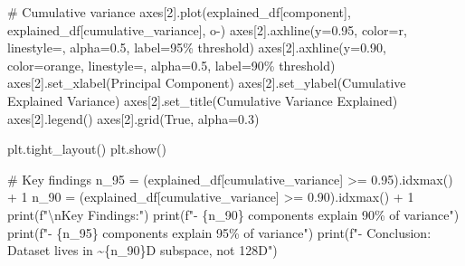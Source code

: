 \documentclass[
  letterpaper,
  DIV=11,
  numbers=noendperiod]{scrartcl}
\newenvironment{Shaded}{\begin{snugshade}}{\end{snugshade}}
\newcommand{\BuiltInTok}[1]{\textcolor[rgb]{0.00,0.23,0.31}{#1}}
\newcommand{\CharTok}[1]{\textcolor[rgb]{0.13,0.47,0.30}{#1}}
\newcommand{\CommentTok}[1]{\textcolor[rgb]{0.37,0.37,0.37}{#1}}
\newcommand{\DecValTok}[1]{\textcolor[rgb]{0.68,0.00,0.00}{#1}}
\newcommand{\FloatTok}[1]{\textcolor[rgb]{0.68,0.00,0.00}{#1}}
\newcommand{\NormalTok}[1]{\textcolor[rgb]{0.00,0.23,0.31}{#1}}
\newcommand{\OperatorTok}[1]{\textcolor[rgb]{0.37,0.37,0.37}{#1}}
\newcommand{\SpecialCharTok}[1]{\textcolor[rgb]{0.37,0.37,0.37}{#1}}
\newcommand{\SpecialStringTok}[1]{\textcolor[rgb]{0.13,0.47,0.30}{#1}}
\newcommand{\StringTok}[1]{\textcolor[rgb]{0.13,0.47,0.30}{#1}}
\newcommand{\VariableTok}[1]{\textcolor[rgb]{0.07,0.07,0.07}{#1}}
\renewenvironment{Shaded}{%
  \begin{tcolorbox}[%
    enhanced,%
    colback=codebg,%
    colframe=codebg,%
    borderline west={3pt}{0pt}{sectionblue},%
    fontupper=\small\ttfamily,%
    boxrule=0pt,%
    arc=0pt,%
    boxsep=5pt,%
    left=2mm,%
    right=2mm,%
    top=2mm,%
    bottom=2mm%
  ]%
}{%
  \end{tcolorbox}%
}
\begin{document}
\begin{Shaded}
\begin{Highlighting}[]
\CommentTok{\# Cumulative variance}
\NormalTok{axes[}\DecValTok{2}\NormalTok{].plot(explained\_df[}\StringTok{\textquotesingle{}component\textquotesingle{}}\NormalTok{], explained\_df[}\StringTok{\textquotesingle{}cumulative\_variance\textquotesingle{}}\NormalTok{], }\StringTok{\textquotesingle{}o{-}\textquotesingle{}}\NormalTok{)}
\NormalTok{axes[}\DecValTok{2}\NormalTok{].axhline(y}\OperatorTok{=}\FloatTok{0.95}\NormalTok{, color}\OperatorTok{=}\StringTok{\textquotesingle{}r\textquotesingle{}}\NormalTok{, linestyle}\OperatorTok{=}\StringTok{\textquotesingle{}{-}{-}\textquotesingle{}}\NormalTok{, alpha}\OperatorTok{=}\FloatTok{0.5}\NormalTok{, label}\OperatorTok{=}\StringTok{\textquotesingle{}95\% threshold\textquotesingle{}}\NormalTok{)}
\NormalTok{axes[}\DecValTok{2}\NormalTok{].axhline(y}\OperatorTok{=}\FloatTok{0.90}\NormalTok{, color}\OperatorTok{=}\StringTok{\textquotesingle{}orange\textquotesingle{}}\NormalTok{, linestyle}\OperatorTok{=}\StringTok{\textquotesingle{}{-}{-}\textquotesingle{}}\NormalTok{, alpha}\OperatorTok{=}\FloatTok{0.5}\NormalTok{, label}\OperatorTok{=}\StringTok{\textquotesingle{}90\% threshold\textquotesingle{}}\NormalTok{)}
\NormalTok{axes[}\DecValTok{2}\NormalTok{].set\_xlabel(}\StringTok{\textquotesingle{}Principal Component\textquotesingle{}}\NormalTok{)}
\NormalTok{axes[}\DecValTok{2}\NormalTok{].set\_ylabel(}\StringTok{\textquotesingle{}Cumulative Explained Variance\textquotesingle{}}\NormalTok{)}
\NormalTok{axes[}\DecValTok{2}\NormalTok{].set\_title(}\StringTok{\textquotesingle{}Cumulative Variance Explained\textquotesingle{}}\NormalTok{)}
\NormalTok{axes[}\DecValTok{2}\NormalTok{].legend()}
\NormalTok{axes[}\DecValTok{2}\NormalTok{].grid(}\VariableTok{True}\NormalTok{, alpha}\OperatorTok{=}\FloatTok{0.3}\NormalTok{)}

\NormalTok{plt.tight\_layout()}
\NormalTok{plt.show()}

\CommentTok{\# Key findings}
\NormalTok{n\_95 }\OperatorTok{=}\NormalTok{ (explained\_df[}\StringTok{\textquotesingle{}cumulative\_variance\textquotesingle{}}\NormalTok{] }\OperatorTok{\textgreater{}=} \FloatTok{0.95}\NormalTok{).idxmax() }\OperatorTok{+} \DecValTok{1}
\NormalTok{n\_90 }\OperatorTok{=}\NormalTok{ (explained\_df[}\StringTok{\textquotesingle{}cumulative\_variance\textquotesingle{}}\NormalTok{] }\OperatorTok{\textgreater{}=} \FloatTok{0.90}\NormalTok{).idxmax() }\OperatorTok{+} \DecValTok{1}
\BuiltInTok{print}\NormalTok{(}\SpecialStringTok{f"}\CharTok{\textbackslash{}n}\SpecialStringTok{Key Findings:"}\NormalTok{)}
\BuiltInTok{print}\NormalTok{(}\SpecialStringTok{f"{-} }\SpecialCharTok{\{}\NormalTok{n\_90}\SpecialCharTok{\}}\SpecialStringTok{ components explain 90\% of variance"}\NormalTok{)}
\BuiltInTok{print}\NormalTok{(}\SpecialStringTok{f"{-} }\SpecialCharTok{\{}\NormalTok{n\_95}\SpecialCharTok{\}}\SpecialStringTok{ components explain 95\% of variance"}\NormalTok{)}
\BuiltInTok{print}\NormalTok{(}\SpecialStringTok{f"{-} Conclusion: Dataset lives in \textasciitilde{}}\SpecialCharTok{\{}\NormalTok{n\_90}\SpecialCharTok{\}}\SpecialStringTok{D subspace, not 128D"}\NormalTok{)}
\end{Highlighting}
\end{Shaded}
\end{document}
